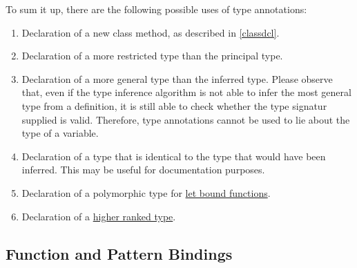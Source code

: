 To sum it up, there are the following possible uses of type annotations:
\begin{enumerate}
\item Declaration of a new class method, as described in \autoref{classdcl}.
\item Declaration of a more restricted type than the principal type.
\item Declaration of a more general type than the inferred type. Please observe that, even if the type inference algorithm is not able to infer the most general type from a definition, it is still able to check whether the type signatur supplied is valid. Therefore, type annotations cannot be used to lie about the type of a variable.
\item Declaration of a type that is identical to the type that would have been inferred. This may be useful for documentation purposes.
\item Declaration of a polymorphic type for \hyperref[generalization]{let bound functions}.
\item Declaration of a \hyperref[higher-rank]{higher ranked type}.
\end{enumerate}


\subsection{Function and Pattern Bindings} \label{binding}

\begin{flushleft}
  \\
  \oder{} \\
  
  \alt {}  \\
 \sym{=}  
  \alt {}   
\end{flushleft}

